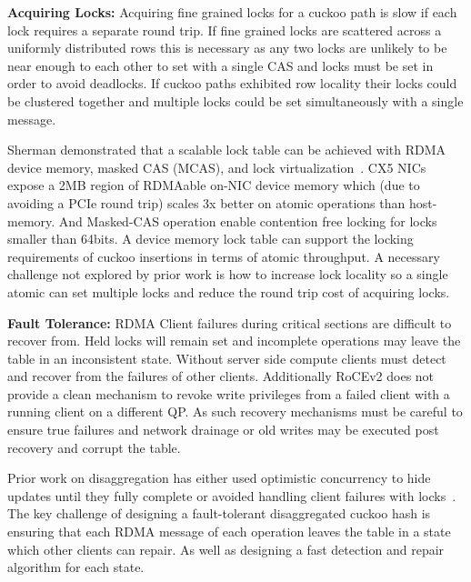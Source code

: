 \textbf{Acquiring Locks:} Acquiring fine grained locks for a
cuckoo path is slow if each lock requires a separate round
trip. If fine grained locks are scattered across a uniformly
distributed rows this is necessary as any two locks are
unlikely to be near enough to each other to set with a
single CAS and locks must be set in order to avoid
deadlocks. If cuckoo paths exhibited row locality their
locks could be clustered together and multiple locks could
be set simultaneously with a single message.

Sherman demonstrated that a scalable lock table can be
achieved with RDMA device memory, masked CAS (MCAS), and
lock virtualization~\cite{sherman}. CX5 NICs expose a 2MB
region of RDMAable on-NIC device memory which (due to
avoiding a PCIe round trip) scales 3x better on atomic
operations than host-memory. And Masked-CAS operation enable
contention free locking for locks smaller than 64bits. 
A device memory lock table can support the locking
requirements of cuckoo insertions in terms of atomic
throughput. A necessary challenge not explored by prior work
is how to increase lock locality so a single atomic can set
multiple locks and reduce the round trip cost of acquiring
locks.

\textbf{Fault Tolerance:} RDMA Client failures during
critical sections are difficult to recover from. Held locks
will remain set and incomplete operations may leave the
table in an inconsistent state. Without server side compute
clients must detect and recover from the failures of other
clients. Additionally RoCEv2 does not provide a clean
mechanism to revoke write privileges from a failed client
with a running client on a different QP. As such recovery
mechanisms must be careful to ensure true failures and
network drainage or old writes may be executed post recovery
and corrupt the table.

Prior work on disaggregation has either used optimistic
concurrency to hide updates until they fully complete or
avoided handling client failures with locks~\cite{sherman}.
The key challenge of designing a fault-tolerant
disaggregated cuckoo hash is ensuring that each RDMA message
of each operation leaves the table in a state which other
clients can repair. As well as designing a fast detection
and repair algorithm for each state.




